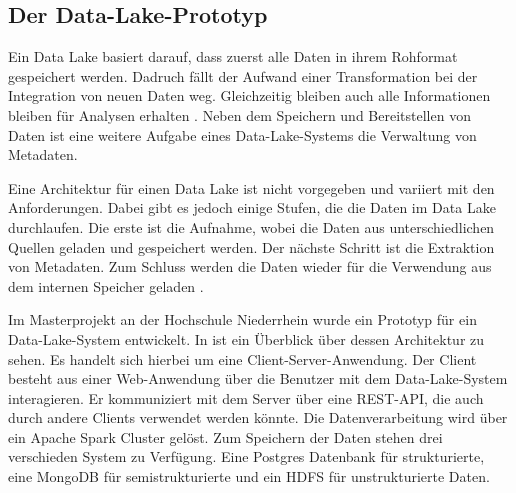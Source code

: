 \subsection{Der Data-Lake-Prototyp}
Ein Data Lake basiert darauf, dass zuerst alle Daten in ihrem Rohformat gespeichert werden.
Dadruch fällt der Aufwand einer Transformation bei der Integration von neuen Daten weg.
Gleichzeitig bleiben auch alle Informationen bleiben für Analysen erhalten \parencite{datalake_03}.
Neben dem Speichern und Bereitstellen von Daten ist eine weitere Aufgabe eines Data-Lake-Systems die Verwaltung von Metadaten.

Eine Architektur für einen Data Lake ist nicht vorgegeben und variiert mit den Anforderungen.
Dabei gibt es jedoch einige Stufen, die die Daten im Data Lake durchlaufen.
Die erste ist die Aufnahme, wobei die Daten aus unterschiedlichen Quellen geladen und gespeichert werden.
Der nächste Schritt ist die Extraktion von Metadaten.
Zum Schluss werden die Daten wieder für die Verwendung aus dem internen Speicher geladen \parencite{datalake_01}.

Im Masterprojekt  \parencite{prototyp} an der Hochschule Niederrhein wurde ein Prototyp für ein Data-Lake-System entwickelt.
In  ist ein Überblick über dessen Architektur zu sehen.
Es handelt sich hierbei um eine Client-Server-Anwendung.
Der Client besteht aus einer Web-Anwendung über die Benutzer mit dem Data-Lake-System interagieren.
Er kommuniziert mit dem Server über eine REST-API, die auch durch andere Clients verwendet werden könnte.
Die Datenverarbeitung wird über ein Apache Spark Cluster gelöst.
Zum Speichern der Daten stehen drei verschieden System zu Verfügung.
Eine Postgres Datenbank für strukturierte, eine MongoDB für semistrukturierte und ein HDFS für unstrukturierte Daten.


